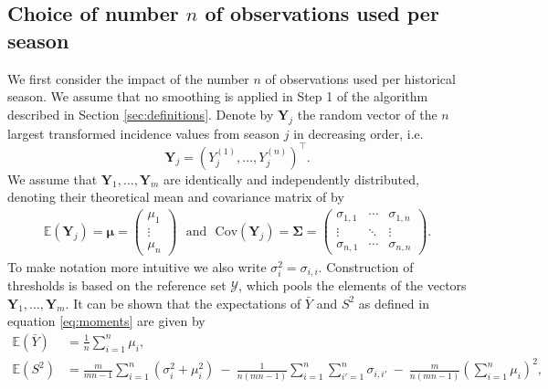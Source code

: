 \documentclass{article}
\newcommand{\mean}{\bar{y}}
\begin{document}
\subsection{Choice of number $n$ of observations used per season}
\label{subsec:choice_n}

We first consider the impact of the number $n$ of observations used per historical season. We assume that no smoothing is applied in Step 1 of the algorithm described in Section \ref{sec:definitions}. Denote by $\mathbf{Y}_j$ the random vector of the $n$ largest transformed incidence values from season $j$ in decreasing order, i.e.
$$
\mathbf{Y}_j = (Y^{(1)}_j, \dots, Y^{(n)}_j)^\top.
$$
We assume that $\mathbf{Y}_1, \dots, \mathbf{Y}_m$ are identically and independently distributed, denoting their theoretical mean and covariance matrix of by
\begin{align}
\mathbb{E}\left(\mathbf{Y}_j\right) = \boldsymbol{\mu} = \left(\begin{array}{c}
\mu_1\\
\vdots\\
\mu_n
\end{array}\right) \ \ \ \text{and} \ \ \ \text{Cov}\left(\mathbf{Y}_j\right) = \boldsymbol{\Sigma} =
\left(\begin{array}{ccc}
\sigma_{1, 1} & \cdots & \sigma_{1, n}\\
\vdots & \ddots &\vdots\\
\sigma_{n, 1} & \cdots & \sigma_{n, n}
\end{array}\right).
\end{align}
To make notation more intuitive we also write $\sigma^2_i = \sigma_{i, i}$. Construction of thresholds is based on the reference set $\mathcal{Y}$, which pools the elements of the vectors $\mathbf{Y}_1, \dots, \mathbf{Y}_m$. It can be shown that the expectations of $\bar{Y}$ and $S^2$ as defined in equation \eqref{eq:moments} are given by
\begin{align}
\mathbb{E}(\bar{Y}) & = \frac{1}{n} \sum_{i = 1}^n \mu_i,
\label{eq:expectation_mu}\\
\mathbb{E}(S^2) & = \frac{m}{mn - 1} \sum_{i = 1}^n (\sigma_{i}^2 + \mu_i^2) \ - \ \frac{1}{n(mn - 1)} \sum_{i = 1}^n \sum_{i' = 1}^n \sigma_{i,i'} \ - \ \frac{m}{n(mn - 1)}\left(\sum_{i = 1}^n \mu_i\right)^2,
\label{eq:expectation_sigma2}
\end{align}
\end{document}
